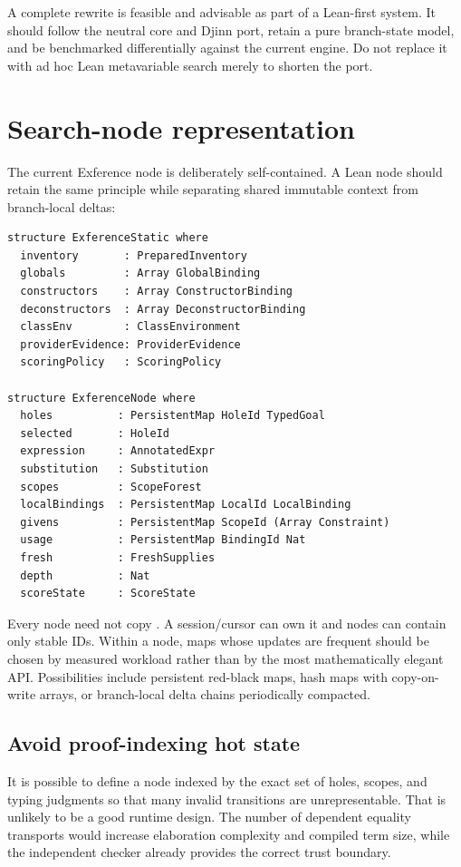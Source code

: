 \documentclass[10pt,letterpaper,oneside]{report}
\newcommand{\code}[1]{\texttt{\detokenize{#1}}}
\begin{document}
\begin{verdictbox}[title={Exference verdict}]
A complete rewrite is feasible and advisable as part of a Lean-first system. It should follow the neutral core and Djinn port, retain a pure branch-state model, and be benchmarked differentially against the current engine. Do not replace it with ad hoc Lean metavariable search merely to shorten the port.
\end{verdictbox}

\section{Search-node representation}

The current Exference node is deliberately self-contained. A Lean node should retain the same principle while separating shared immutable context from branch-local deltas:

\begin{lstlisting}[language=Leanish]
structure ExferenceStatic where
  inventory       : PreparedInventory
  globals         : Array GlobalBinding
  constructors    : Array ConstructorBinding
  deconstructors  : Array DeconstructorBinding
  classEnv        : ClassEnvironment
  providerEvidence: ProviderEvidence
  scoringPolicy   : ScoringPolicy

structure ExferenceNode where
  holes          : PersistentMap HoleId TypedGoal
  selected       : HoleId
  expression     : AnnotatedExpr
  substitution   : Substitution
  scopes         : ScopeForest
  localBindings  : PersistentMap LocalId LocalBinding
  givens         : PersistentMap ScopeId (Array Constraint)
  usage          : PersistentMap BindingId Nat
  fresh          : FreshSupplies
  depth          : Nat
  scoreState     : ScoreState
\end{lstlisting}

Every node need not copy \code{ExferenceStatic}. A session/cursor can own it and nodes can contain only stable IDs. Within a node, maps whose updates are frequent should be chosen by measured workload rather than by the most mathematically elegant API. Possibilities include persistent red-black maps, hash maps with copy-on-write arrays, or branch-local delta chains periodically compacted.

\subsection{Avoid proof-indexing hot state}

It is possible to define a node indexed by the exact set of holes, scopes, and typing judgments so that many invalid transitions are unrepresentable. That is unlikely to be a good runtime design. The number of dependent equality transports would increase elaboration complexity and compiled term size, while the independent checker already provides the correct trust boundary.
\end{document}
